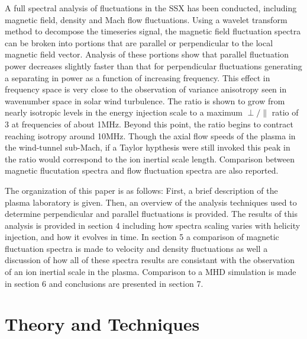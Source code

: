 \documentclass[aip,prl,amsmath,amssymb,reprint,superscriptaddress]{revtex4-1} %
\begin{document}
A full spectral analysis of fluctuations in the SSX has been conducted, including magnetic field, density and Mach flow fluctuations. Using a wavelet transform method to decompose the timeseries signal, the magnetic field fluctuation spectra can be broken into portions that are parallel or perpendicular to the local magnetic field vector. Analysis of these portions show that parallel fluctuation power decreases slightly faster than that for perpendicular fluctuations generating a separating in power as a function of increasing frequency. This effect in frequency space is very close to the observation of variance anisotropy seen in wavenumber space in solar wind turbulence. The ratio is shown to grow from nearly isotropic levels in the energy injection scale to a maximum $\perp/\parallel$ ratio of 3 at frequencies of about 1MHz. Beyond this point, the ratio begins to contract reaching isotropy around 10MHz. Though the axial flow speeds of the plasma in the wind-tunnel sub-Mach, if a Taylor hypthesis were still invoked this peak in the ratio would correspond to the ion inertial scale length. Comparison between magnetic flucutation spectra and flow fluctuation spectra are also reported.

The organization of this paper is as follows: First, a brief description of the plasma laboratory is given. Then, an overview of the analysis techniques used to determine perpendicular and parallel fluctuations is provided. The results of this analysis is provided in section 4 including how spectra scaling varies with helicity injection, and how it evolves in time. In section 5 a comparison of magnetic fluctuation spectra is made to velocity and density fluctuations as well a discussion of how all of these spectra results are consistant with the observation of an ion inertial scale in the plasma. Comparison to a MHD simulation is made in section 6 and conclusions are presented in section 7.


\section{Theory and Techniques}
\end{document}
